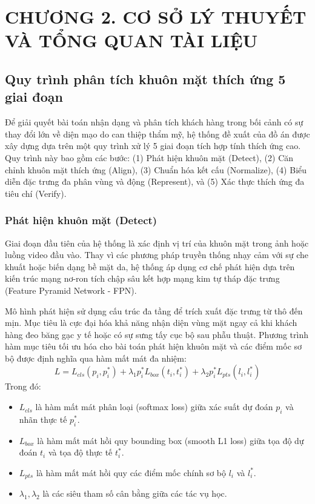 \section*{CHƯƠNG 2. CƠ SỞ LÝ THUYẾT VÀ TỔNG QUAN TÀI LIỆU}
\setcounter{section}{2}
\setcounter{subsection}{0}
\setcounter{figure}{0}
\setcounter{table}{0}

\subsection{Quy trình phân tích khuôn mặt thích ứng 5 giai đoạn}
Để giải quyết bài toán nhận dạng và phân tích khách hàng trong bối cảnh có sự thay đổi lớn về diện mạo do can thiệp thẩm mỹ, hệ thống đề xuất của đồ án được xây dựng dựa trên một quy trình xử lý 5 giai đoạn tích hợp tính thích ứng cao. Quy trình này bao gồm các bước: (1) Phát hiện khuôn mặt (Detect), (2) Căn chỉnh khuôn mặt thích ứng (Align), (3) Chuẩn hóa kết cấu (Normalize), (4) Biểu diễn đặc trưng đa phân vùng và động (Represent), và (5) Xác thực thích ứng đa tiêu chí (Verify).

\subsubsection{Phát hiện khuôn mặt (Detect)}
Giai đoạn đầu tiên của hệ thống là xác định vị trí của khuôn mặt trong ảnh hoặc luồng video đầu vào. Thay vì các phương pháp truyền thống nhạy cảm với sự che khuất hoặc biến dạng bề mặt da, hệ thống áp dụng cơ chế phát hiện dựa trên kiến trúc mạng nơ-ron tích chập sâu kết hợp mạng kim tự tháp đặc trưng (Feature Pyramid Network - FPN).

Mô hình phát hiện sử dụng cấu trúc đa tầng để trích xuất đặc trưng từ thô đến mịn. Mục tiêu là cực đại hóa khả năng nhận diện vùng mặt ngay cả khi khách hàng đeo băng gạc y tế hoặc có sự sưng tấy cục bộ sau phẫu thuật. Phương trình hàm mục tiêu tối ưu hóa cho bài toán phát hiện khuôn mặt và các điểm mốc sơ bộ được định nghĩa qua hàm mất mát đa nhiệm:
\begin{equation}
    L = L_{cls}(p_i, p_i^*) + \lambda_1 p_i^* L_{box}(t_i, t_i^*) + \lambda_2 p_i^* L_{pts}(l_i, l_i^*)
\end{equation}
Trong đó:
\begin{itemize}
    \item $L_{cls}$ là hàm mất mát phân loại (softmax loss) giữa xác suất dự đoán $p_i$ và nhãn thực tế $p_i^*$.
    \item $L_{box}$ là hàm mất mát hồi quy bounding box (smooth L1 loss) giữa tọa độ dự đoán $t_i$ và tọa độ thực tế $t_i^*$.
    \item $L_{pts}$ là hàm mất mát hồi quy các điểm mốc chính sơ bộ $l_i$ và $l_i^*$.
    \item $\lambda_1, \lambda_2$ là các siêu tham số cân bằng giữa các tác vụ học.
\end{itemize}

